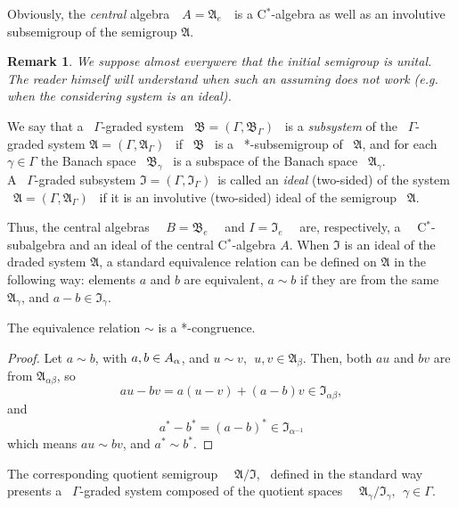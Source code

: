 \documentclass[
11pt,%
tightenlines,%
twoside,%
onecolumn,%
nofloats,%
nobibnotes,%
nofootinbib,%
superscriptaddress,%
noshowpacs,%
centertags]%
{revtex4}
\newtheorem{remark}{Remark} %
\begin{document}
\noindent Obviously, the  {\em central}  algebra\ \ $A = \mathfrak A_e$\ \ is a C$^*$-algebra as well as an involutive subsemigroup of the semigroup $\mathfrak A$.
\begin{remark}
    We suppose almost everywere that the initial semigroup is unital. The reader himself will understand when such an assuming does not work (e.g. when the considering system is an ideal).
\end{remark}
\begin{definition} We say that a \ $\Gamma$-graded system \ $\mathfrak B = (\Gamma,\mathfrak B_ \Gamma)$ \ is a  {\em subsystem} of  the \ $\Gamma$-graded system $\mathfrak A = (\Gamma,\mathfrak A_ \Gamma)$ \ if \  $\mathfrak B$ \ is a \ *-subsemigroup of \  $\mathfrak A$,  and for each $\gamma\in\Gamma$  the Banach space \ $\mathfrak B_\gamma$ \ is a subspace of the Banach space \ $\mathfrak A_\gamma$.\\
A \ $\Gamma$-graded  subsystem  $\mathfrak I =(\Gamma, \mathfrak I_\Gamma)$\ is called an {\em ideal} (two-sided) of the system \ $\mathfrak A = (\Gamma, \mathfrak A_\Gamma)$ \ if it is an involutive (two-sided) ideal  of the semigroup \ $\mathfrak A$.
\end{definition}
\noindent Thus, the central algebras \ \  $B = \mathfrak B_e$ \ \  and $I = \mathfrak I_e$ \ \  are, respectively, a \ \ C$^*$-subalgebra and an ideal of the central  C$^*$-algebra $A$.
When $\mathfrak I$ is an ideal of the draded system $\mathfrak A$, a standard equivalence relation can be defined on $\mathfrak A$ in the following way: elements $a$ and $b$  are equivalent, $a\sim b$   if they are from the same $\mathfrak A_\gamma$, and $a - b\in \mathfrak I_\gamma$.

\begin{proposition} The equivalence relation $\sim$ is a *-congruence.
\end{proposition}
\begin{proof} Let $a\sim b$, with $a, b\in\mathfrak \mathfrak A_\alpha$, and  $u\sim v,\ \  u, v\in \mathfrak  A_\beta$.  Then, both  $au$  and  $bv$  are  from $\mathfrak  A_{\alpha\beta}$,  so
$$au - bv  = a (u - v)  +  (a - b) v\in\mathfrak I_{\alpha\beta},$$
and
$$a^* - b^* =  (a - b)^*\in\mathfrak I_{\alpha^{-1}}$$
which means  $au\sim bv$,  and  $a^*\sim  b^*$.
\end{proof}
\noindent The corresponding quotient semigroup \ \  $\mathfrak A/\mathfrak I$, \   defined in the standard way presents a \ $\Gamma$-graded system   composed of the quotient spaces \ \ $\mathfrak A_\gamma/\mathfrak I_\gamma, \ \  \gamma\in\Gamma$.
\end{document}
